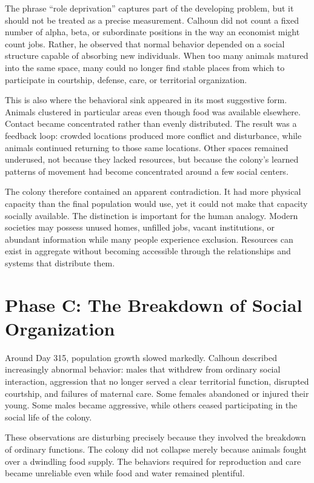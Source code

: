 ﻿\documentclass[12pt,a4paper]{book}
\begin{document}
The phrase ``role deprivation'' captures part of the developing problem, but it should not be treated as a precise measurement. Calhoun did not count a fixed number of alpha, beta, or subordinate positions in the way an economist might count jobs. Rather, he observed that normal behavior depended on a social structure capable of absorbing new individuals. When too many animals matured into the same space, many could no longer find stable places from which to participate in courtship, defense, care, or territorial organization.

This is also where the behavioral sink appeared in its most suggestive form. Animals clustered in particular areas even though food was available elsewhere. Contact became concentrated rather than evenly distributed. The result was a feedback loop: crowded locations produced more conflict and disturbance, while animals continued returning to those same locations. Other spaces remained underused, not because they lacked resources, but because the colony's learned patterns of movement had become concentrated around a few social centers.

The colony therefore contained an apparent contradiction. It had more physical capacity than the final population would use, yet it could not make that capacity socially available. The distinction is important for the human analogy. Modern societies may possess unused homes, unfilled jobs, vacant institutions, or abundant information while many people experience exclusion. Resources can exist in aggregate without becoming accessible through the relationships and systems that distribute them.

\section{Phase C: The Breakdown of Social Organization}

Around Day 315, population growth slowed markedly. Calhoun described increasingly abnormal behavior: males that withdrew from ordinary social interaction, aggression that no longer served a clear territorial function, disrupted courtship, and failures of maternal care. Some females abandoned or injured their young. Some males became aggressive, while others ceased participating in the social life of the colony.

These observations are disturbing precisely because they involved the breakdown of ordinary functions. The colony did not collapse merely because animals fought over a dwindling food supply. The behaviors required for reproduction and care became unreliable even while food and water remained plentiful.
\end{document}
